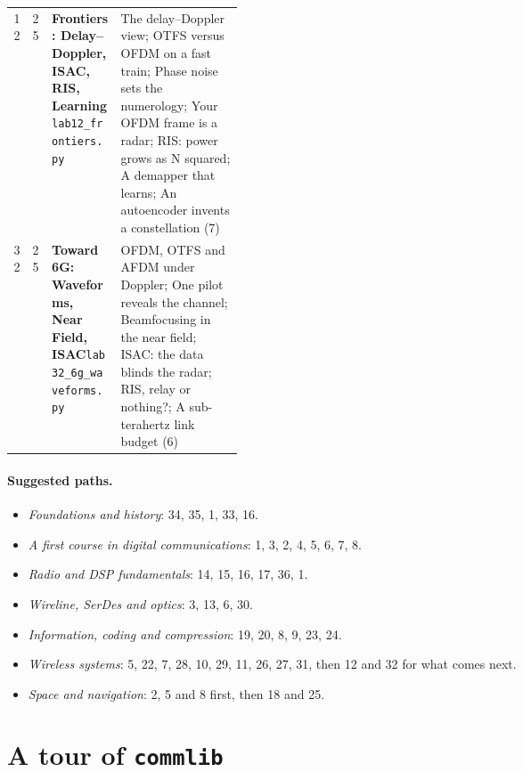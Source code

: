 \begin{table}[htbp]
\begin{tabularx}{\linewidth}{@{}rl>{\raggedright}p{0.30\linewidth}>{\raggedright\arraybackslash}X@{}}
12 & 25 & \textbf{Frontiers: Delay--Doppler, ISAC, RIS, Learning}\newline\texttt{lab12\_\allowbreak{}frontiers.py} & The delay--Doppler view; OTFS versus OFDM on a fast train; Phase noise sets the numerology; Your OFDM frame is a radar; RIS: power grows as N squared; A demapper that learns; An autoencoder invents a constellation (7)\\
32 & 25 & \textbf{Toward 6G: Waveforms, Near Field, ISAC}\newline\texttt{lab32\_\allowbreak{}6g\_\allowbreak{}waveforms.py} & OFDM, OTFS and AFDM under Doppler; One pilot reveals the channel; Beamfocusing in the near field; ISAC: the data blinds the radar; RIS, relay or nothing?; A sub-terahertz link budget (6)\\
\bottomrule
\end{tabularx}
\end{table}

\paragraph{Suggested paths.}
\begin{itemize}[leftmargin=1.5em,itemsep=2pt]
\item \emph{Foundations and history}: 34, 35, 1, 33, 16.
\item \emph{A first course in digital communications}: 1, 3, 2, 4, 5, 6, 7, 8.
\item \emph{Radio and DSP fundamentals}: 14, 15, 16, 17, 36, 1.
\item \emph{Wireline, SerDes and optics}: 3, 13, 6, 30.
\item \emph{Information, coding and compression}: 19, 20, 8, 9, 23, 24.
\item \emph{Wireless systems}: 5, 22, 7, 28, 10, 29, 11, 26, 27, 31, then 12 and 32 for what comes next.
\item \emph{Space and navigation}: 2, 5 and 8 first, then 18 and 25.
\end{itemize}

\section{A tour of \texttt{commlib}}
\label{sec:appB:commlib}


